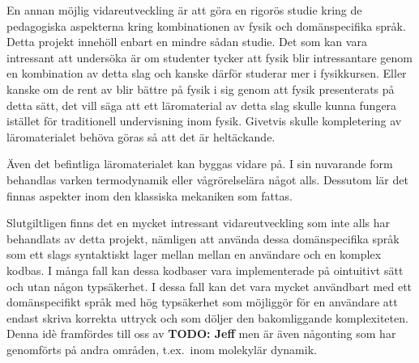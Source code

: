 \begin{draft}
En annan möjlig vidareutveckling är att göra en rigorös studie kring de
pedagogiska aspekterna kring kombinationen av fysik och domänspecifika språk.
Detta projekt innehöll enbart en mindre sådan studie. Det som kan vara
intressant att undersöka är om studenter tycker att fysik blir intressantare
genom en kombination av detta slag och kanske därför studerar mer i fysikkursen.
Eller kanske om de rent av blir bättre på fysik i sig genom att fysik
presenterats på detta sätt, det vill säga att ett läromaterial av detta slag
skulle kunna fungera istället för traditionell undervisning inom fysik. Givetvis
skulle kompletering av läromaterialet behöva göras så att det är heltäckande.

Även det befintliga läromaterialet kan byggas vidare på. I sin nuvarande
form behandlas varken termodynamik eller vågrörelselära något alls. Dessutom lär
det finnas aspekter inom den klassiska mekaniken som fattas.

\end{draft}
\begin{binge}

Slutgiltligen finns det en mycket intressant vidareutveckling som inte alls har
behandlats av detta projekt, nämligen att använda dessa domänspecifika språk som
ett slags syntaktiskt lager mellan mellan en användare och en komplex kodbas. I
många fall kan dessa kodbaser vara implementerade på ointuitivt sätt och utan
någon typsäkerhet. I dessa fall kan det vara mycket användbart med ett
domänspecifikt språk med hög typsäkerhet som möjliggör för en användare att
endast skriva korrekta uttryck och som döljer den bakomliggande komplexiteten.
Denna idè framfördes till oss av \textbf{TODO: Jeff} men är även någonting som
har genomförts på andra områden, t.ex.~inom molekylär dynamik\cite{MD}.

\end{binge}

